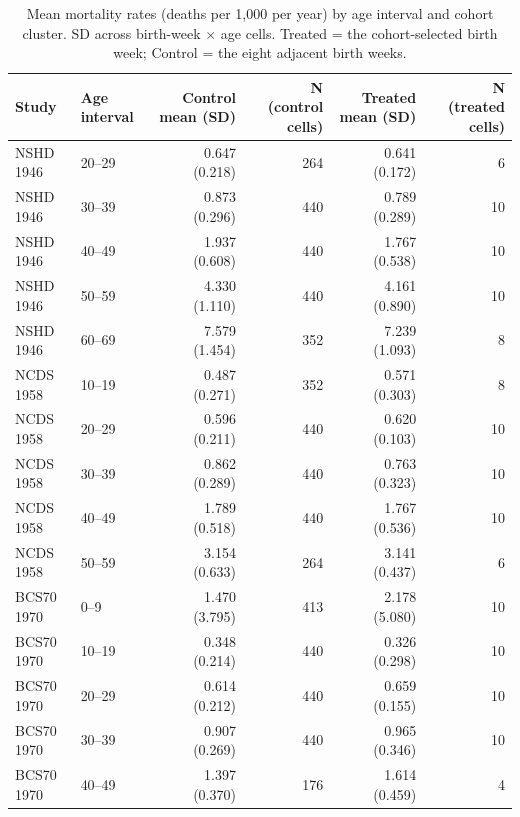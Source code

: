 \begin{table}[htbp]
\centering
\small
\caption{Mean mortality rates (deaths per 1,000 per year) by age interval and cohort cluster. SD across birth-week $\times$ age cells. Treated = the cohort-selected birth week; Control = the eight adjacent birth weeks.}
\label{tab:descriptive}
\begin{tabular}{llrrrr}
\toprule
Study & Age interval & Control mean (SD) & N (control cells) & Treated mean (SD) & N (treated cells) \\
\midrule
NSHD 1946 & 20–29 & 0.647 (0.218) & 264 & 0.641 (0.172) & 6 \\
NSHD 1946 & 30–39 & 0.873 (0.296) & 440 & 0.789 (0.289) & 10 \\
NSHD 1946 & 40–49 & 1.937 (0.608) & 440 & 1.767 (0.538) & 10 \\
NSHD 1946 & 50–59 & 4.330 (1.110) & 440 & 4.161 (0.890) & 10 \\
NSHD 1946 & 60–69 & 7.579 (1.454) & 352 & 7.239 (1.093) & 8 \\
\midrule
NCDS 1958 & 10–19 & 0.487 (0.271) & 352 & 0.571 (0.303) & 8 \\
NCDS 1958 & 20–29 & 0.596 (0.211) & 440 & 0.620 (0.103) & 10 \\
NCDS 1958 & 30–39 & 0.862 (0.289) & 440 & 0.763 (0.323) & 10 \\
NCDS 1958 & 40–49 & 1.789 (0.518) & 440 & 1.767 (0.536) & 10 \\
NCDS 1958 & 50–59 & 3.154 (0.633) & 264 & 3.141 (0.437) & 6 \\
\midrule
BCS70 1970 & 0–9 & 1.470 (3.795) & 413 & 2.178 (5.080) & 10 \\
BCS70 1970 & 10–19 & 0.348 (0.214) & 440 & 0.326 (0.298) & 10 \\
BCS70 1970 & 20–29 & 0.614 (0.212) & 440 & 0.659 (0.155) & 10 \\
BCS70 1970 & 30–39 & 0.907 (0.269) & 440 & 0.965 (0.346) & 10 \\
BCS70 1970 & 40–49 & 1.397 (0.370) & 176 & 1.614 (0.459) & 4 \\
\bottomrule
\end{tabular}
\end{table}